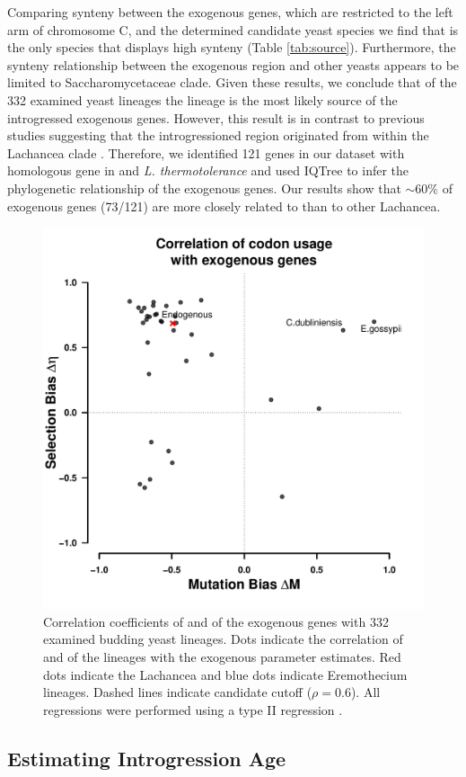 \documentclass[fleqn,letterpaper]{article}
\begin{document}
Comparing synteny between the exogenous genes, which are restricted to the left arm of chromosome C, and the determined candidate yeast species we find that \gossypii is the only species that displays high synteny (Table \ref{tab:source}).
Furthermore, the synteny relationship between the exogenous region and other yeasts appears to be limited to Saccharomycetaceae clade.
Given these results, we conclude that of the 332 examined yeast lineages the \gossypii lineage is the most likely source of the introgressed exogenous genes.
However, this result is in contrast to previous studies suggesting that the introgressioned region originated from within the Lachancea clade \citep{payen2009, vakirlis2016}.
Therefore, we identified 121 genes in our dataset \citep{shen2018} with homologous gene in \gossypii and \textit{L. thermotolerance} and used IQTree \citep{nguyen2015} to infer the phylogenetic relationship of the exogenous genes. Our results show that $\sim 60 \%$ of exogenous genes (73/121) are more closely related to \gossypii than to other Lachancea.


\begin{figure}
     \centering
	\includegraphics[width=.45\textwidth]{img/csp_mean_correlation_exo.pdf}
	\caption{Correlation coefficients of \DM and \DE of the exogenous genes with 332 examined budding yeast lineages. 
	Dots indicate the correlation of \DM and \DE of the lineages with the exogenous parameter estimates.
	Red dots indicate the Lachancea and blue dots indicate Eremothecium lineages.
	Dashed lines indicate candidate cutoff ($\rho = 0.6$). 
	All regressions were performed using a type II regression \citep{SokalAndRohlf1981}.}
	\label{fig:csp_exo_comp}
\end{figure}


\subsection*{Estimating Introgression Age}
\end{document}
